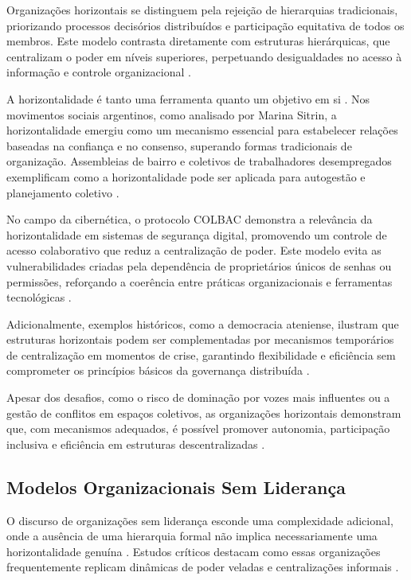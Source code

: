 Organizações horizontais se distinguem pela rejeição de hierarquias
tradicionais, priorizando processos decisórios distribuídos e participação
equitativa de todos os membros. Este modelo contrasta diretamente com
estruturas hierárquicas, que centralizam o poder em níveis superiores,
perpetuando desigualdades no acesso à informação e controle organizacional
\cite{Non-HierarchicalForms, EstatutosDoPCP}.

A horizontalidade é tanto uma ferramenta quanto um objetivo em si \cite{Colbac}. Nos
movimentos sociais argentinos, como analisado por Marina Sitrin, a
horizontalidade emergiu como um mecanismo essencial para estabelecer
relações baseadas na confiança e no consenso, superando formas tradicionais
de organização. Assembleias de bairro e coletivos de trabalhadores
desempregados exemplificam como a horizontalidade pode ser aplicada para
autogestão e planejamento coletivo \cite{EverydayRevolutions}.

No campo da cibernética, o protocolo COLBAC demonstra a relevância da
horizontalidade em sistemas de segurança digital, promovendo um controle de
acesso colaborativo que reduz a centralização de poder. Este modelo evita
as vulnerabilidades criadas pela dependência de proprietários únicos de
senhas ou permissões, reforçando a coerência entre práticas organizacionais
e ferramentas tecnológicas \cite{Colbac}.

Adicionalmente, exemplos históricos, como a democracia ateniense, ilustram
que estruturas horizontais podem ser complementadas por mecanismos
temporários de centralização em momentos de crise, garantindo flexibilidade
e eficiência sem comprometer os princípios básicos da governança
distribuída \cite{AthenianDemocracyABrief}.

Apesar dos desafios, como o risco de dominação por vozes mais influentes ou
a gestão de conflitos em espaços coletivos, as organizações horizontais
demonstram que, com mecanismos adequados, é possível promover autonomia,
participação inclusiva e eficiência em estruturas descentralizadas
\cite{SocialMediaTeamsAsDigitalVanguards}.

\subsection{Modelos Organizacionais Sem Liderança}
\label{sec:modelos_sem_lideranca}

O discurso de organizações sem liderança esconde uma complexidade
adicional, onde a ausência de uma hierarquia formal não implica
necessariamente uma horizontalidade genuína \cite{SocialMediaTeamsAsDigitalVanguards}.
Estudos críticos destacam como essas organizações frequentemente
replicam dinâmicas de poder veladas e centralizações informais
\cite{SocialMediaTeamsAsDigitalVanguards, EverydayRevolutions}.

